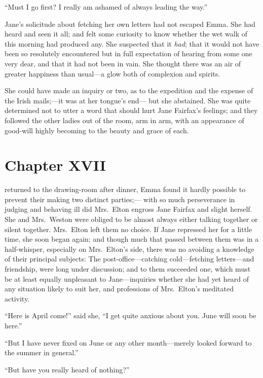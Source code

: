 ``Must I go first?  I really am ashamed of always leading the way.''

Jane's solicitude about fetching her own letters had not escaped Emma.
She had heard and seen it all; and felt some curiosity to know
whether the wet walk of this morning had produced any.  She suspected
that it \emph{had}; that it would not have been so resolutely encountered
but in full expectation of hearing from some one very dear,
and that it had not been in vain.  She thought there was an air
of greater happiness than usual---a glow both of complexion and spirits.

She could have made an inquiry or two, as to the expedition
and the expense of the Irish mails;---it was at her tongue's end---%
but she abstained.  She was quite determined not to utter a word
that should hurt Jane Fairfax's feelings; and they followed
the other ladies out of the room, arm in arm, with an appearance
of good-will highly becoming to the beauty and grace of each.



\chapter{Chapter XVII}


 returned to the drawing-room after dinner, Emma found
it hardly possible to prevent their making two distinct parties;---%
with so much perseverance in judging and behaving ill did Mrs.\ Elton
engross Jane Fairfax and slight herself.  She and Mrs.\ Weston were
obliged to be almost always either talking together or silent together.
Mrs.\ Elton left them no choice.  If Jane repressed her for a
little time, she soon began again; and though much that passed
between them was in a half-whisper, especially on Mrs.\ Elton's side,
there was no avoiding a knowledge of their principal subjects:
The post-office---catching cold---fetching letters---and friendship,
were long under discussion; and to them succeeded one, which must
be at least equally unpleasant to Jane---inquiries whether she had
yet heard of any situation likely to suit her, and professions of
Mrs.\ Elton's meditated activity.

``Here is April come!'' said she, ``I get quite anxious about you.
June will soon be here.''

``But I have never fixed on June or any other month---merely looked
forward to the summer in general.''

``But have you really heard of nothing?''

